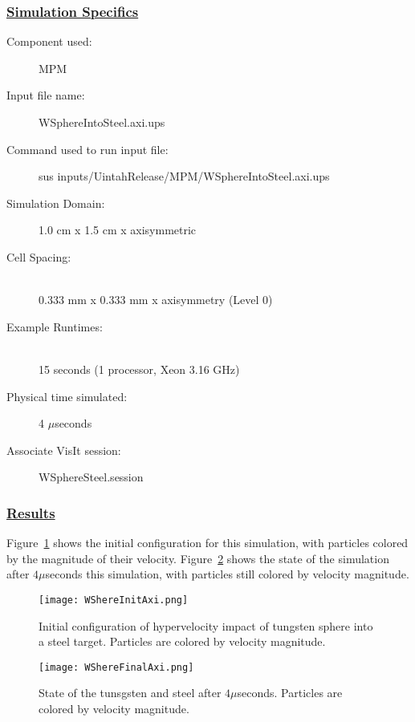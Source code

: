 \subsubsection*{\underline{Simulation Specifics}}
\begin{description}
\item [Component used:] \hfill MPM
\item [Input file name:] \hfill WSphereIntoSteel.axi.ups
\item [Command used to run input file:]\hfill \newline sus inputs/UintahRelease/MPM/WSphereIntoSteel.axi.ups
\item [Simulation Domain:]\hfill 1.0 cm x 1.5 cm x axisymmetric

\item [Cell Spacing:]\hfill \\
  0.333 mm x 0.333 mm x axisymmetry (Level 0)

\item [Example Runtimes:] \hfill \\
 15 seconds  (1 processor, Xeon 3.16 GHz)\\

\item [Physical time simulated:] \hfill 4 $\mu$seconds

\item [Associate VisIt session:] \hfill WSphereSteel.session

\end{description}

\subsubsection*{\underline{Results}}

Figure~\ref{fig:WSphereSteelInit} shows the initial configuration for
this simulation, with particles colored by the magnitude of their velocity.
Figure~\ref{fig:WSphereSteelFinal} shows the state of the simulation after
$4 \mu$seconds this simulation, with particles still colored by velocity
magnitude.

\begin{figure}
  \center
  \texttt{[image: WShereInitAxi.png]}
  \caption{Initial configuration of hypervelocity impact of tungsten sphere
           into a steel target.  Particles are
           colored by velocity magnitude.}
  \label{fig:WSphereSteelInit}
\end{figure}
\newpage
\begin{figure}
  \center
  \texttt{[image: WShereFinalAxi.png]}
  \caption{State of the tunsgsten and steel after $4 \mu$seconds.
           Particles are colored by velocity magnitude.}
  \label{fig:WSphereSteelFinal}
\end{figure}

